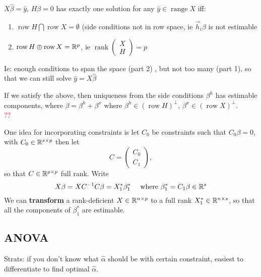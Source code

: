 \documentclass{article}
\newcommand\myworries[1]{\textcolor{red}{#1}}
\newcommand{\rank}{\operatorname{rank}}
\newcommand{\range}{\operatorname{range}}
\newcommand{\row}{\operatorname{row}}
\begin{document}
    \begin{theorem}
        $X\hat \beta = \hat y$, $H\beta = 0 $ has exactly one solution for any $\hat y\in \range X$ iff: 
        \begin{enumerate}
            \item $\row H \bigcap \row X = \emptyset $ (side conditions not in row space, ie $\vec h_i \beta$ is not estimable 
            \item $\row H \oplus \row X = \R^p$, ie $\rank \begin{pmatrix}
                X\\
                H
            \end{pmatrix} = p$
        \end{enumerate}
        Ie: enough conditions to span the space (part 2) , but not too many (part 1), so that we can still solve $\hat y = X\hat \beta $
    \end{theorem}

    \begin{corollary}
        If we satisfy the above, then uniqueness from the side conditions $\beta^h$ has estimable components, where $\beta = \beta^h + \beta^x$ where $\beta^h \in (\row H)^\perp   $, $\beta^x \in (\row X)^
\perp $.\\
\myworries{??}
    \end{corollary}
    One idea for incorporating constraints is let $C_0$ be constraints such that $C_0 \beta = 0$, with $C_0 \in \mathbb R^{s\times p} $ then let 
    $$C = \begin{pmatrix}
        C_0\\
        C_1
    \end{pmatrix},$$
    so that $C\in \mathbb R^{p\times p}$ full rank.
    Write
    $$X\beta = XC^{-1} C \beta = X_1^* \beta_1^* \quad \text { where } \beta_1^* = C_1 \beta\in \mathbb R^s $$
    We can \textbf{transform} a rank-deficient $X\in \mathbb R^{n\times p}$ to a full rank $X_1^* \in \mathbb R^{n\times s}$, so that all the components of $\beta_1^*$ are estimable.



\subsection{ANOVA}
Strats: if you don't know what $\hat \alpha$ should be with certain constraint, easiest to differentiate to find optimal $\hat \alpha$. \\\\
\end{document}
